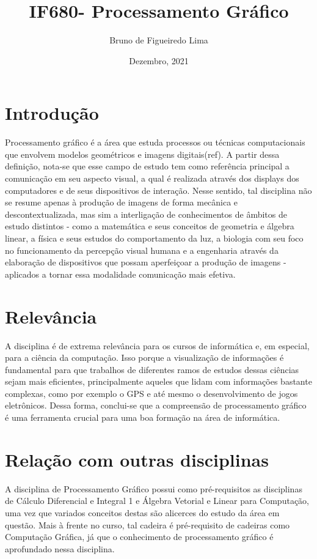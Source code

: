 \documentclass{article}
\title{IF680- Processamento Gráfico}
\author{Bruno de Figueiredo Lima}
\date{Dezembro, 2021}
\begin{document}
\maketitle

\section{Introdução}
Processamento gráfico é a área que estuda processos ou técnicas computacionais que envolvem modelos geométricos e imagens digitais(ref). A partir dessa definição, nota-se que esse campo de estudo tem como referência principal a comunicação em seu aspecto visual, a qual é realizada através dos displays dos computadores e de seus dispositivos de interação\cite{foley1996computer}. Nesse sentido, tal disciplina não se resume apenas à produção de imagens de forma mecânica e descontextualizada, mas sim a interligação de conhecimentos de âmbitos de estudo distintos - como a matemática e seus conceitos de geometria e álgebra linear, a física e seus estudos do comportamento da luz, a biologia com seu foco no funcionamento da percepção visual humana e a engenharia através da elaboração de dispositivos que possam aperfeiçoar a produção de imagens - aplicados a tornar essa modalidade comunicação mais efetiva.

\section{Relevância}
A disciplina é de extrema relevância para os cursos de informática e, em especial, para a ciência da computação. Isso porque a visualização de informações é fundamental para que trabalhos de diferentes ramos de estudos dessas ciências sejam mais eficientes, principalmente aqueles que lidam com informações bastante complexas, como por exemplo o GPS e até mesmo o desenvolvimento de jogos eletrônicos. Dessa forma, conclui-se que a compreensão de processamento gráfico é uma ferramenta crucial para uma boa formação na área de informática.

\section{Relação com outras disciplinas}
A disciplina de Processamento Gráfico possui como pré-requisitos as disciplinas de Cálculo Diferencial e Integral 1 e Álgebra Vetorial e Linear para Computação, uma vez que variados conceitos destas são alicerces do estudo da área em questão. Mais à frente no curso, tal cadeira é pré-requisito de cadeiras como Computação Gráfica, já que o conhecimento de processamento gráfico é aprofundado nessa disciplina. 
\end{document}
